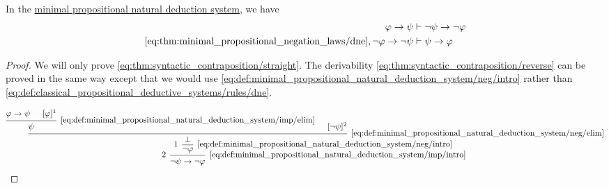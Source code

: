 \begin{proposition}\label{thm:syntactic_contraposition}
  In the \hyperref[def:minimal_propositional_natural_deduction_system]{minimal propositional natural deduction system}, we have
  \begin{align}
    \varphi \rightarrow \psi &\vdash \neg \psi \rightarrow \neg \varphi \label{eq:thm:syntactic_contraposition/straight} \\
    \eqref{eq:thm:minimal_propositional_negation_laws/dne}, \neg \varphi \rightarrow \neg \psi &\vdash \psi \rightarrow \varphi \label{eq:thm:syntactic_contraposition/reverse}
  \end{align}
\end{proposition}
\begin{proof}
  We will only prove \eqref{eq:thm:syntactic_contraposition/straight}. The derivability \eqref{eq:thm:syntactic_contraposition/reverse} can be proved in the same way except that we would use \eqref{eq:def:minimal_propositional_natural_deduction_system/neg/intro} rather than \eqref{eq:def:classical_propositional_deductive_systems/rules/dne}.

  \begin{equation*}
    \begin{prooftree}
      \hypo{ \varphi \rightarrow \psi }
      \hypo{ [\varphi]^1 }
      \infer2[\eqref{eq:def:minimal_propositional_natural_deduction_system/imp/elim}]{ \psi }

      \hypo{ [\neg \psi]^2 }
      \infer2[\eqref{eq:def:minimal_propositional_natural_deduction_system/neg/elim}]{ \bot }

      \infer[left label=\( 1 \)]1[\eqref{eq:def:minimal_propositional_natural_deduction_system/neg/intro}]{ \neg \varphi }
      \infer[left label=\( 2 \)]1[\eqref{eq:def:minimal_propositional_natural_deduction_system/imp/intro}]{ \neg \psi \rightarrow \neg \varphi }
    \end{prooftree}
  \end{equation*}
\end{proof}

